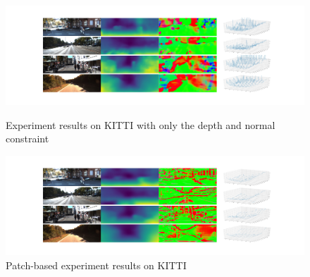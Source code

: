 \documentclass[10pt,twocolumn,letterpaper]{article}
\begin{document}
\begin{figure}
  \includegraphics[width=\linewidth]{output.jpg}
  \caption{Experiment results on KITTI with only the depth and normal constraint}
  \label{fig:KITTI_orth}
  \includegraphics[width=\linewidth]{patch_based.jpg}
  \caption{Patch-based experiment results on KITTI}
  \label{fig:KITTI_patch}
\end{figure}








{\small


}
\end{document}
